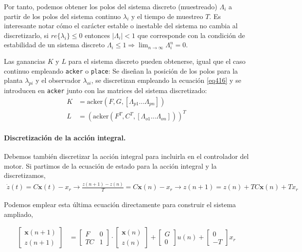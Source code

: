 \documentclass[10pt,a4paper]{report}
\begin{document}
Por tanto, podemos obtener los polos del sistema discreto (muestreado) $\Lambda_i$ a partir de los polos del sistema continuo $\lambda_i$ y el tiempo de muestreo $T$. Es interesante notar cómo el carácter estable o inestable del sistema no cambia al discretizarlo, si $re\{\lambda_i\} \le 0$ entonces $|\Lambda_i| < 1$ que corresponde con la condición de estabilidad de un sistema discreto $\Lambda_i \le 1 \Rightarrow  \lim_{n\rightarrow \infty} \Lambda_i^n =0$.

Las ganancias $K$ y $L$ para el sistema discreto pueden obtenerse, igual que el caso continuo empleando \texttt{acker} o \texttt{place}: Se diseñan la posición de los polos para la planta $\lambda_{pi}$ y el observador $\lambda_{oi}$, se discretizan empleando la ecuación \ref{eq416} y se introducen en \texttt{acker} junto con las matrices del sistema discretizado:
\begin{align*}
K &= \text{acker}(F,G,[\Lambda_{p1}...\Lambda_{pn}])\\
L &= \left(\text{acker}(F^T,C^T,[\Lambda_{o1}...\Lambda_{on}])\right)^T
\end{align*}

\paragraph{Discretización de la acción integral.} Debemos también discretizar la acción integral para incluirla en el controlador del motor. Si partimos de la ecuación de estado para la acción integral y la discretizamos,
\begin{align*}
\dot{z}(t) = C \mathbf{x}(t) - x_r \rightarrow \frac{z(n+1)-z(n)}{T}= C \mathbf{x}(n) - x_r \rightarrow z(n+1) = z(n) +TC  \mathbf{x}(n) +Tx_r
\end{align*}

Podemos emplear esta última ecuación directamente para construir el sistema ampliado,

\begin{align}
\begin{bmatrix}
\mathbf{x}(n+1)\\
z(n+1)
\end{bmatrix} &= \begin{bmatrix}
F & 0\\
TC & 1
\end{bmatrix}\cdot\begin{bmatrix}
\mathbf{x}(n)\\
z(n)
\end{bmatrix}+\begin{bmatrix}
G\\
0
\end{bmatrix}u(n) + \begin{bmatrix}
0\\
-T
\end{bmatrix}x_r
\end{align}  
\end{document}
